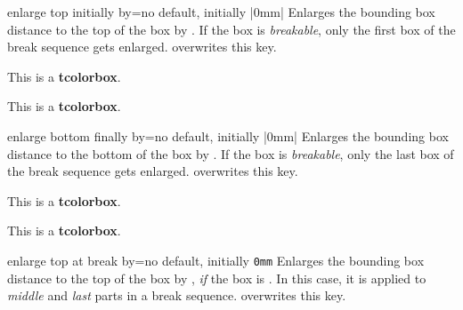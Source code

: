 \begin{docTcbKey}{enlarge top initially by}{=}{no default, initially |0mm|}
  Enlarges the bounding box distance to the top of the box by .
  If the box is \emph{breakable}, only the first box of the break sequence
  gets enlarged.  overwrites this key.
\begin{dispExample}

\begin{tcolorbox}[enlarge top initially by=-5mm]
This is a \textbf{tcolorbox}.
\end{tcolorbox}
\begin{tcolorbox}[enlarge top initially by=5mm,enhanced,show bounding box]
This is a \textbf{tcolorbox}.
\end{tcolorbox}
\end{dispExample}
\end{docTcbKey}



\begin{docTcbKey}{enlarge bottom finally by}{=}{no default, initially |0mm|}
  Enlarges the bounding box distance to the bottom of the box by .
  If the box is \emph{breakable}, only the last box of the break sequence
  gets enlarged.  overwrites this key.
\begin{dispExample}

\begin{tcolorbox}[enlarge bottom finally by=5mm]
This is a \textbf{tcolorbox}.
\end{tcolorbox}
\begin{tcolorbox}[enlarge bottom finally by=-5mm,enhanced,show bounding box]
This is a \textbf{tcolorbox}.
\end{tcolorbox}
\end{dispExample}
\end{docTcbKey}

\clearpage


\begin{docTcbKey}{enlarge top at break by}{=}{no default, initially \texttt{0mm}}
  Enlarges the bounding box distance to the top of the box by ,
  \emph{if} the box is .
  In this case, it is applied to \emph{middle} and \emph{last} parts in a
  break sequence.
   overwrites this key.
\end{docTcbKey}


